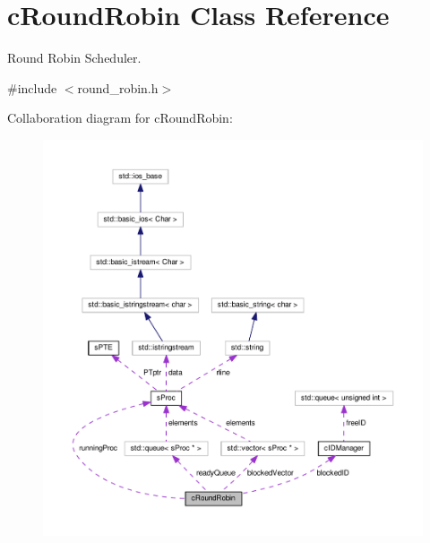 \hypertarget{classcRoundRobin}{\section{c\-Round\-Robin \-Class \-Reference}
\label{dc/dcc/classcRoundRobin}
}


\-Round \-Robin \-Scheduler.  




{\ttfamily \#include $<$round\-\_\-robin.\-h$>$}



\-Collaboration diagram for c\-Round\-Robin\-:\nopagebreak
\begin{figure}[H]
\begin{center}
\leavevmode
\includegraphics[width=350pt]{de/d42/classcRoundRobin__coll__graph}
\end{center}
\end{figure}

